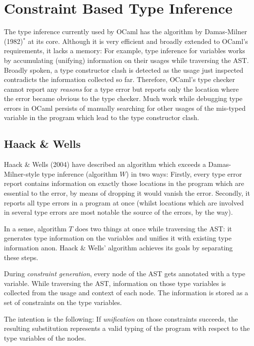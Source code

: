 
\section{Constraint Based Type Inference}
\label{hd002}
\label{startpart1}

The type inference currently used by OCaml has the algorithm by 
Damas-Milner (1982)$^{*}$\protect{} at its 
core.  Although it is very efficient and broadly extended to OCaml's 
requirements, it lacks a memory:  For example, type inference for 
variables works by accumulating (unifying) information on their usages 
while traversing the AST. Broadly spoken, a type constructor clash is 
detected as the usage just inspected contradicts the information 
collected so far.  Therefore, OCaml's type checker cannot report any 
\emph{reasons} for a type error but reports only the location where the 
error became obvious to the type checker.  Much work while debugging 
type errors in OCaml persists of manually searching for other usages of 
the mis-typed variable in the program which lead to the type constructor 
clash.


\subsection{Haack \& Wells}
\label{hd002001}
Haack \& Wells (2004) have described an algorithm which exceeds a 
Damas-Milner-style type inference (algorithm $W$) in two ways: Firstly, 
every type error report contains information on exactly those locations 
in the program which are essential to the error, by means of dropping it 
would vanish the error.  Secondly, it reports all type errors in a 
program at once (whilst locations which are involved in several type 
errors are most notable the source of the errors, by the way).

In a sense, algorithm $T$ does two things at once while traversing the 
AST: it generates type information on the variables and unifies it with 
existing type information anon.  Haack \& Wells' algorithm achieves its 
goals by separating these steps.

During \emph{constraint generation}, every node of the AST gets 
annotated with a type variable. While traversing the AST, information on 
those type variables is collected from the usage and context of each 
node.  The information is stored as a set of constraints on the type 
variables.

The intention is the following: If \emph{unification} on those 
constraints succeeds, the resulting substitution represents a valid 
typing of the program with respect to the type variables of the nodes.

